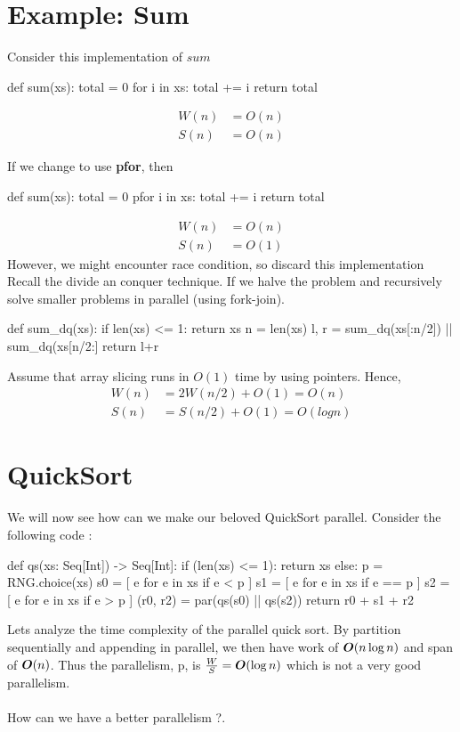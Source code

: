 \documentclass[12pt]{article}
\begin{document}
\section{Example: Sum}
Consider this implementation of $sum$
\begin{python}
def sum(xs):
    total = 0
    for i in xs:
        total += i
    return total
\end{python}
\begin{align*}
    W(n) &= O(n)\\
    S(n) &= O(n)
\end{align*}

If we change to use \textbf{pfor}, then
\begin{python}
def sum(xs):
    total = 0
    pfor i in xs:
        total += i
    return total
\end{python}
\begin{align*}
    W(n) &= O(n)\\
    S(n) &= O(1)
\end{align*}
However, we might encounter race condition, so discard this implementation\\
Recall the divide an conquer technique. If we halve the problem and recursively solve smaller problems in parallel (using fork-join).
\begin{python}
def sum_dq(xs):
    if len(xs) <= 1:
        return xs
    n = len(xs)
    l, r = sum_dq(xs[:n/2]) || sum_dq(xs[n/2:]
    return l+r
\end{python}
Assume that array slicing runs in $O(1)$ time by using pointers. Hence,
\begin{align*}
    W(n) &= 2W(n/2) + O(1) = O(n)\\
    S(n) &= S(n/2) + O(1) = O(logn)
\end{align*}

\section{QuickSort}
We will now see how can we make our beloved QuickSort parallel. Consider the following code :

\begin{python}
def qs(xs: Seq[Int]) -> Seq[Int]:
	if (len(xs) <= 1): return xs
	else:
		p = RNG.choice(xs)
		s0 = [ e for e in xs if e < p ]
		s1 = [ e for e in xs if e == p ] 
		s2 = [ e for e in xs if e > p ]
		(r0, r2) = par(qs(s0) || qs(s2))
		return r0 + s1 + r2
\end{python}

Lets analyze the time complexity of the parallel quick sort. By partition sequentially and appending in parallel, we then have work of ${\boldsymbol O}(n\log n)$ and span of ${\boldsymbol O}(n)$. Thus the parallelism, p, is $\frac{W}{S}={\boldsymbol O}(\log n)$ which is not a very good parallelism.\\
\\
How can we have a better parallelism ?.
\end{document}

